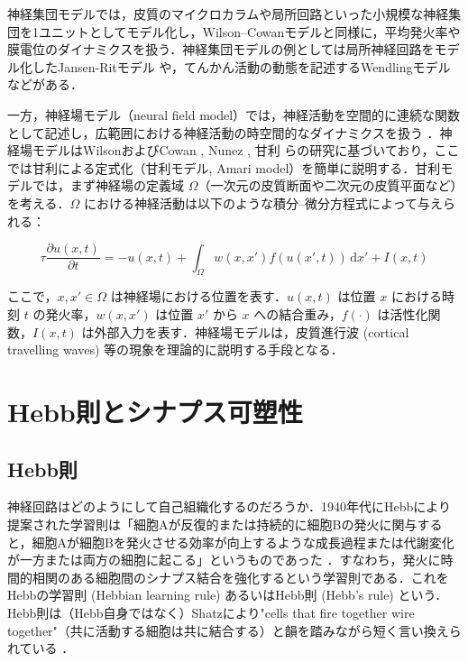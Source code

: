 \documentclass[titlepage]{ltjsbook}
\begin{document}
神経集団モデルでは，皮質のマイクロカラムや局所回路といった小規模な神経集団を1ユニットとしてモデル化し，Wilson–Cowanモデルと同様に，平均発火率や膜電位のダイナミクスを扱う．神経集団モデルの例としては局所神経回路をモデル化したJansen-Ritモデル \citep{jansen1995electroencephalogram, david2003neural} や，てんかん活動の動態を記述するWendlingモデル \citep{wendling2002epileptic} などがある．

一方，神経場モデル（neural field model）では，神経活動を空間的に連続な関数として記述し，広範囲における神経活動の時空間的なダイナミクスを扱う \citep{coombes2014tutorial, cook2022neural}．神経場モデルはWilsonおよびCowan \citep{wilson1973mathematical}, Nunez \citep{nunez1974brain}, 甘利 \citep{amari1975homogeneous, amari1977dynamics} らの研究に基づいており，ここでは甘利による定式化（甘利モデル, Amari model）を簡単に説明する．甘利モデルでは，まず神経場の定義域 $\Omega$（一次元の皮質断面や二次元の皮質平面など）を考える．$\Omega$ における神経活動は以下のような積分–微分方程式によって与えられる：

\begin{equation}
\tau \frac{\partial u(x,t)}{\partial t} = -u(x,t) + \int_{\Omega} w(x, x') f(u(x', t))\,\mathrm{d}x' + I(x,t)
\end{equation}

ここで，$x, x' \in \Omega$ は神経場における位置を表す．$u(x,t)$ は位置 $x$ における時刻 $t$ の発火率，$w(x,x')$ は位置 $x'$ から $x$ への結合重み，$f(\cdot)$ は活性化関数，$I(x,t)$ は外部入力を表す．神経場モデルは，皮質進行波 (cortical travelling waves) \citep{muller2018cortical}等の現象を理論的に説明する手段となる．

\section{Hebb則とシナプス可塑性}
\subsection{Hebb則}
神経回路はどのようにして自己組織化するのだろうか．1940年代にHebbにより提案された学習則は「細胞Aが反復的または持続的に細胞Bの発火に関与すると，細胞Aが細胞Bを発火させる効率が向上するような成長過程または代謝変化が一方または両方の細胞に起こる」というものであった \citep{Hebb1949-iv}．すなわち，発火に時間的相関のある細胞間のシナプス結合を強化するという学習則である．これをHebbの学習則 (Hebbian learning rule) あるいはHebb則 (Hebb's rule) という．Hebb則は（Hebb自身ではなく）Shatzにより"cells that fire together wire together"（共に活動する細胞は共に結合する）と韻を踏みながら短く言い換えられている \citep{Shatz1992-he}．
\end{document}
